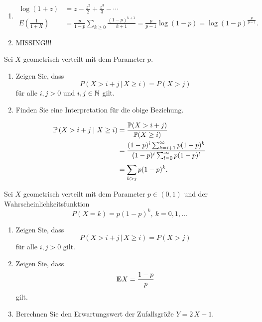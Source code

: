 \solution
\begin{enumerate}
    \item \begin{align*}
            \log (1+z) &= z - \frac{z^2}{2} + \frac{z^3}{3} - \cdots \\
            E \left( \frac{1}{1+X} \right) &= \frac{p}{1-p} \sum_{k\geq 0} \frac{(1-p)^{k+1}}{k+1}
            = \frac{p}{p-1} \log \left( 1-p \right) = \log (1-p)^{\frac{p}{p-1}}. 
        \end{align*}

    \item MISSING!!!
\end{enumerate}

 Sei $X$ geometrisch
verteilt mit dem Parameter $p$.
\begin{enumerate}
    \item Zeigen Sie, dass 
        \begin{equation*}
            P \left( X > i+j \,|\, X \geq i \right) = P\left( X > j \right) 
        \end{equation*}
        für alle $i,j>0$ und $i,j\in\mathbb N$ gilt.

    \item Finden Sie eine Interpretation für die obige Beziehung.
\end{enumerate}

\solution 
\begin{align*}
    \mathbb P\left( X > i+j \;\middle\vert\; X \geq i \right) &= \frac{\mathbb P(X > i+j)}{\mathbb P(X \geq i)} \\
    &= \frac{  (1-p)^{i} \sum_{k=i+1}^{\infty} p(1-p)^{k} }{ (1-p)^{i} \sum_{l=0}^{\infty} p(1-p)^{l} } \\
    &= \sum_{k > j}^{} p(1-p)^k.
\end{align*}


 Sei 
$X$ geometrisch verteilt mit dem Parameter $p\in (0,1)$ und der 
Wahrscheinlichkeitsfunktion
\begin{equation*}
    P(X = k) = p(1-p)^{k}, \ k=0,1,\dots
\end{equation*}
\begin{enumerate}
    \item Zeigen Sie, dass
        \begin{equation*}
            P( X > i+j \,|\, X \geq i) = P(X > j)
        \end{equation*}
        für alle $i,j>0$ gilt.
    \item Zeigen Sie, dass 
        \begin{align*}
            \mathbf E X = \frac{1-p}{p}
        \end{align*}
        gilt.
    \item Berechnen Sie den Erwartungswert der Zufallsgröße $Y=2\,X -1$.
\end{enumerate}


